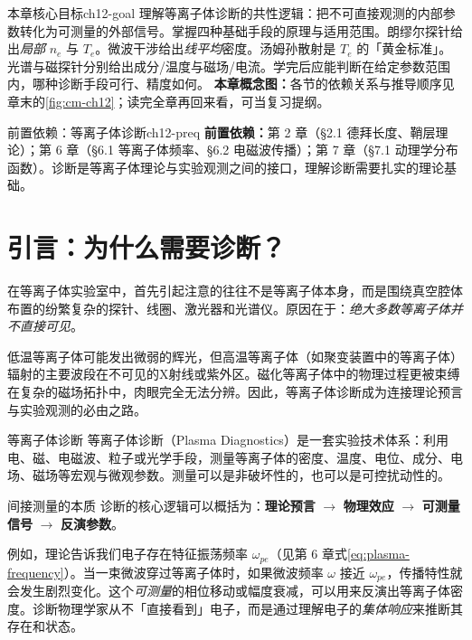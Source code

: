 \documentclass[12pt,a4paper,openany,oneside]{book}
\begin{document}
\begin{insight}{本章核心目标}{ch12-goal}
理解等离子体诊断的共性逻辑：把不可直接观测的内部参数转化为可测量的外部信号。掌握四种基础手段的原理与适用范围。朗缪尔探针给出\emph{局部} $n_e$ 与 $T_e$。微波干涉给出\emph{线平均}密度。汤姆孙散射是 $T_e$ 的「黄金标准」。光谱与磁探针分别给出成分/温度与磁场/电流。学完后应能判断在给定参数范围内，哪种诊断手段可行、精度如何。
\textbf{本章概念图：}各节的依赖关系与推导顺序见章末的\cref{fig:cm-ch12}；读完全章再回来看，可当复习提纲。
\end{insight}

\begin{tip}{前置依赖：等离子体诊断}{ch12-preq}
\textbf{前置依赖：}第 2 章（\S 2.1 德拜长度、鞘层理论）；第 6 章（\S 6.1 等离子体频率、\S 6.2 电磁波传播）；第 7 章（\S 7.1 动理学分布函数）。诊断是等离子体理论与实验观测之间的接口，理解诊断需要扎实的理论基础。
\end{tip}

\section{引言：为什么需要诊断？}
\label{sec:12.1}

在等离子体实验室中，首先引起注意的往往不是等离子体本身，而是围绕真空腔体布置的纷繁复杂的探针、线圈、激光器和光谱仪。原因在于：\emph{绝大多数等离子体并不直接可见}。

低温等离子体可能发出微弱的辉光，但高温等离子体（如聚变装置中的等离子体）辐射的主要波段在不可见的X射线或紫外区。磁化等离子体中的物理过程更被束缚在复杂的磁场拓扑中，肉眼完全无法分辨。因此，等离子体诊断成为连接理论预言与实验观测的必由之路。

\begin{definition}{等离子体诊断}{}{}
等离子体诊断（Plasma Diagnostics）是一套实验技术体系：利用电、磁、电磁波、粒子或光学手段，测量等离子体的密度、温度、电位、成分、电场、磁场等宏观与微观参数。测量可以是非破坏性的，也可以是可控扰动性的。
\end{definition}

\begin{insight}{间接测量的本质}{}
诊断的核心逻辑可以概括为：\textbf{理论预言} $\rightarrow$ \textbf{物理效应} $\rightarrow$ \textbf{可测量信号} $\rightarrow$ \textbf{反演参数}。

例如，理论告诉我们电子存在特征振荡频率 $\omega_{pe}$（见第 6 章式\eqref{eq:plasma-frequency}）。当一束微波穿过等离子体时，如果微波频率 $\omega$ 接近 $\omega_{pe}$，传播特性就会发生剧烈变化。这个\emph{可测量}的相位移动或幅度衰减，可以用来反演出等离子体密度。诊断物理学家从不「直接看到」电子，而是通过理解电子的\emph{集体响应}来推断其存在和状态。
\end{insight}
\end{document}
